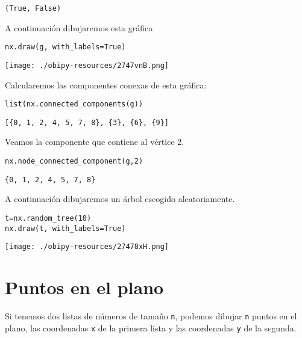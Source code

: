 \documentclass[11pt]{article}
\begin{document}
\begin{verbatim}
(True, False)
\end{verbatim}

A continuación dibujaremos esta gráfica
\lstset{language=ipython,label= ,caption= ,captionpos=b,numbers=none}
\begin{lstlisting}
nx.draw(g, with_labels=True)
\end{lstlisting}

\begin{center}
\texttt{[image: ./obipy-resources/2747vnB.png]}
\end{center}

Calcularemos las componentes conexas de esta gráfica:
\lstset{language=ipython,label= ,caption= ,captionpos=b,numbers=none}
\begin{lstlisting}
list(nx.connected_components(g))
\end{lstlisting}

\begin{verbatim}
[{0, 1, 2, 4, 5, 7, 8}, {3}, {6}, {9}]
\end{verbatim}

Veamos la componente que contiene al vértice 2.

\lstset{language=ipython,label= ,caption= ,captionpos=b,numbers=none}
\begin{lstlisting}
nx.node_connected_component(g,2)
\end{lstlisting}

\begin{verbatim}
{0, 1, 2, 4, 5, 7, 8}
\end{verbatim}

A continuación dibujaremos un árbol escogido aleatoriamente. 

\lstset{language=ipython,label= ,caption= ,captionpos=b,numbers=none}
\begin{lstlisting}
t=nx.random_tree(10)
nx.draw(t, with_labels=True)
\end{lstlisting}

\begin{center}
\texttt{[image: ./obipy-resources/27478xH.png]}
\end{center}

\section{Puntos en el plano}
\label{sec:org4b5391a}

Si tenemos dos listas de números de tamaño \texttt{n}, podemos dibujar \texttt{n} puntos en el plano,
las coordenadas \texttt{x} de la primera lista y las coordenadas \texttt{y} de la segunda.
\end{document}
